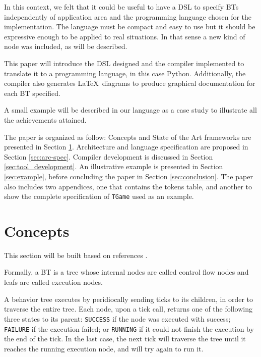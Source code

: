 \documentclass[a4paper,UKenglish,cleveref, autoref, thm-restate]{oasics-v2019}
\begin{document}
In this context, we felt that it could be useful to have a DSL to specify BTs independently of application area and the programming language chosen for the implementation.
The language must be compact and easy to use but it should be expressive enough to be applied to real situations.
In that sense a new kind of node was included, as will be described.

This paper will introduce the DSL designed and the compiler implemented to translate it to a programming language, in this case Python.
Additionally, the compiler also generates \LaTeX\ diagrams to produce graphical documentation for each BT specified.

A small example will be described in our language as a case study to illustrate all the achievements attained.

The paper is organized as follow: Concepts and State of the Art frameworks are presented in Section \ref{sec:concepts}.
Architecture and language specification are proposed in Section \ref{sec:arc-spec}.
Compiler development is discussed in Section \ref{sec:tool_development}.
An illustrative example is presented in Section \ref{sec:example}, 
before concluding the paper in Section \ref{sec:conclusion}.
The paper also includes two appendices, one that contains the tokens table,
 and another to show the complete specification of \texttt{TGame} used as an example.

\section{Concepts}
\label{sec:concepts}

This section will be built based on references \cite{ColOgr2018,Simpson2014,MilFunge2009}.

Formally, a BT is a tree whose internal nodes are called control flow nodes and leafs are called execution nodes.

A behavior tree executes by peridiocally sending ticks to its children, in order to traverse the entire tree.
Each node, upon a tick call, returns one of the following three states to its parent: \texttt{SUCCESS} if the node was executed with success; \texttt{FAILURE} if the execution failed; or \texttt{RUNNING} if it could not finish the execution by the end of the tick.
In the last case, the next tick will traverse the tree until it reaches the running execution node, and will try again to run it.
\end{document}
